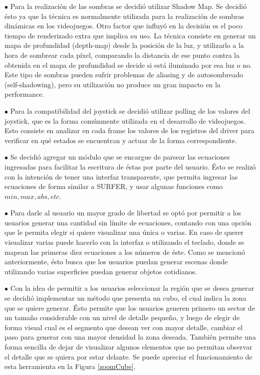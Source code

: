 \documentclass[12pt]{article}
\begin{document}
$\bullet$ Para la realización de las sombras se decidió utilizar Shadow Map\cite{shadowmap}\cite{realtimerendering}. Se decidió ésto ya que la técnica es normalmente utilizada para la realización de sombras dinámicas en los videojuegos\cite{engine}\cite{realtimerendering}. Otro factor que influyó en la decisión es el poco tiempo de renderizado extra que implica su uso. La técnica consiste en generar un mapa de profundidad (depth-map) desde la posición de la luz, y utilizarlo a la hora de sombrear cada píxel, comparando la distancia de ese punto contra la obtenida en el mapa de profundidad se decide si está iluminado por esa luz o no. Este tipo de sombras pueden sufrir problemas de aliasing y de autosombreado (self-shadowing)\cite{realtimerendering}, pero su utilización no produce un gran impacto en la performance.

$\bullet$ Para la compatibilidad del joystick se decidió utilizar polling de los valores del joystick, que es la forma comúnmente utilizada en el desarrollo de videojuegos\cite{engine}. Esto consiste en analizar en cada frame los valores de los registros del driver para verificar en qué estados se encuentran y actuar de la forma correspondiente.

$\bullet$ Se decidió agregar un módulo que se encargue de parsear las ecuaciones ingresadas para facilitar la escritura de éstas por parte del usuario. Ésto se realizó con la intención de tener una interfaz transparente, que permita ingresar las ecuaciones de forma similar a SURFER, y usar algunas funciones como $min, max, abs, etc$.

$\bullet$ Para darle al usuario un mayor grado de libertad se optó por permitir a los usuarios generar una cantidad sin límite de ecuaciones, contando con una opción que le permita elegir si quiere visualizar una única o varias. En caso de querer visualizar varias puede hacerlo con la interfaz o utilizando el teclado, donde se mapean las primeras diez ecuaciones a los números de éste. Como se mencionó anteriormente, ésto busca que los usuarios puedan generar escenas donde utilizando varias superficies puedan generar objetos cotidianos.

$\bullet$ Con la idea de permitir a los usuarios seleccionar la región que se desea generar se decidió implementar un método que presenta un cubo, el cual indica la zona que se quiere generar. Ésto permite que los usuarios generen primero un sector de un tamaño considerable con un nivel de detalle pequeño, y luego de elegir de forma visual cual es el segmento que desean ver con mayor detalle, cambiar el paso para generar con una mayor densidad la zona deseada. También permite una forma sencilla de dejar de visualizar algunos elementos que no permitan observar el detalle que se quiera por estar delante. Se puede apreciar el funcionamiento de esta herramienta en la Figura \ref{zoomCube}.
\end{document}
